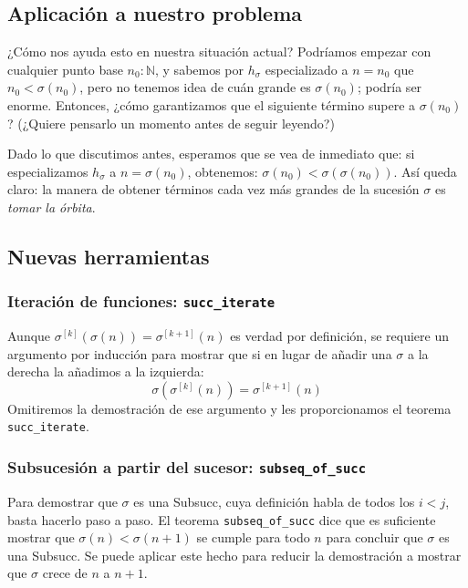 \subsection{Aplicación a nuestro problema}

¿Cómo nos ayuda esto en nuestra situación actual? Podríamos empezar con
cualquier punto base $n_0 : \mathbb{N}$, y sabemos por $h_\sigma$
especializado a $n = n_0$ que $n_0 < \sigma(n_0)$, pero no tenemos idea
de cuán grande es $\sigma(n_0)$; podría ser enorme. Entonces, ¿cómo
garantizamos que el siguiente término supere a $\sigma(n_0)$? (¿Quiere
pensarlo un momento antes de seguir leyendo?)

Dado lo que discutimos antes, esperamos que se vea de inmediato que: si
especializamos $h_\sigma$ a $n = \sigma(n_0)$, obtenemos:
$\sigma(n_0) < \sigma(\sigma(n_0))$. Así queda claro: la manera de
obtener términos cada vez más grandes de la sucesión $\sigma$ es
\emph{tomar la órbita}.

\subsection{Nuevas herramientas}

\subsubsection{Iteración de funciones: \texttt{succ\_iterate}}

Aunque $\sigma^{[k]}(\sigma(n)) = \sigma^{[k+1]}(n)$ es verdad por
definición, se requiere un argumento por inducción para mostrar que si en
lugar de añadir una $\sigma$ a la derecha la añadimos a la izquierda:
\[
  \sigma(\sigma^{[k]}(n)) = \sigma^{[k+1]}(n)
\]
Omitiremos la demostración de ese argumento y les proporcionamos el
teorema \texttt{succ\_iterate}.

\subsubsection{Subsucesión a partir del sucesor: \texttt{subseq\_of\_succ}}

Para demostrar que $\sigma$ es una Subsucc, cuya definición habla de todos
los $i < j$, basta hacerlo paso a paso. El teorema \texttt{subseq\_of\_succ}
dice que es suficiente mostrar que $\sigma(n) < \sigma(n+1)$ se cumple
para todo $n$ para concluir que $\sigma$ es una Subsucc. Se puede aplicar
este hecho para reducir la demostración a mostrar que $\sigma$ crece de
$n$ a $n+1$.

